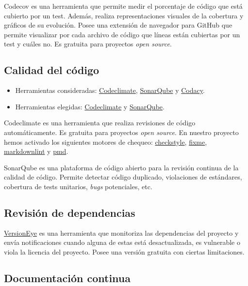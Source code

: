 Codecov es una herramienta que permite medir el porcentaje de código que
está cubierto por un test. Además, realiza representaciones visuales de
la cobertura y gráficos de su evolución. Posee una extensión de
navegador para GitHub que permite visualizar por cada archivo de código
que líneas están cubiertas por un test y cuáles no. Es gratuita para
proyectos \emph{open source}.

\subsection{Calidad del código}\label{calidad-del-codigo}

\begin{itemize}
\tightlist
\item
  Herramientas consideradas:
  \href{https://codeclimate.com/}{Codeclimate},
  \href{https://sonarqube.com/}{SonarQube} y
  \href{https://www.codacy.com/}{Codacy}.
\item
  Herramientas elegidas: \href{https://codeclimate.com/}{Codeclimate} y
  \href{https://sonarqube.com/}{SonarQube}.
\end{itemize}

Codeclimate es una herramienta que realiza revisiones de código
automáticamente. Es gratuita para proyectos \emph{open source}. En
nuestro proyecto hemos activado los siguientes motores de chequeo:
\href{https://docs.codeclimate.com/docs/checkstyle}{checkstyle},
\href{https://docs.codeclimate.com/docs/fixme}{fixme},
\href{https://docs.codeclimate.com/docs/markdownlint}{markdownlint} y
\href{https://docs.codeclimate.com/docs/pmd}{pmd}.

SonarQube es una plataforma de código abierto para la revisión continua
de la calidad de código. Permite detectar código duplicado, violaciones
de estándares, cobertura de tests unitarios, \emph{bugs} potenciales,
etc.

\subsection{Revisión de dependencias}\label{revision-de-dependencias}

\href{https://www.versioneye.com/}{VersionEye} es una herramienta que monitoriza las dependencias del
proyecto y envía notificaciones cuando alguna de estas está
desactualizada, es vulnerable o viola la licencia del proyecto. Posee
una versión gratuita con ciertas limitaciones.

\subsection{Documentación continua}\label{documentacion-continua}


